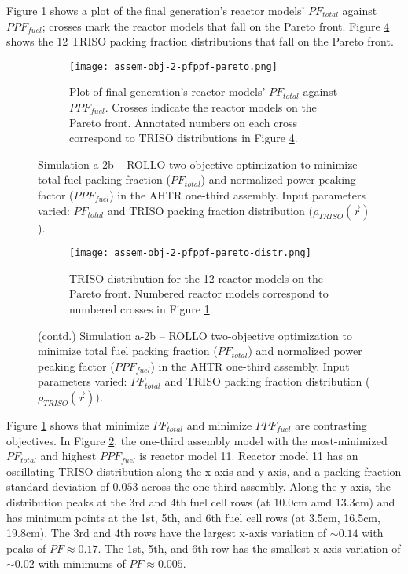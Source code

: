 Figure \ref{fig:assem-obj-2-pfppf-pareto} shows a plot of the final generation's reactor 
models' $PF_{total}$ against $PPF_{fuel}$; crosses mark the reactor models that fall on 
the Pareto front.
Figure \ref{fig:assem-obj-2-pfppf-pareto-distr} shows the 12 TRISO packing fraction 
distributions that fall on the Pareto front. 
\begin{figure}[htbp!]
    \begin{subfigure}{\textwidth}
        \centering
        \texttt{[image: assem-obj-2-pfppf-pareto.png]}
        \caption{Plot of final generation's reactor models' $PF_{total}$ against 
        $PPF_{fuel}$. 
        Crosses indicate the reactor models on the Pareto front. Annotated numbers 
        on each cross correspond to TRISO distributions in Figure 
        \ref{fig:assem-obj-2-pfppf-pareto-distr}.}
        \label{fig:assem-obj-2-pfppf-pareto} 
    \end{subfigure}
    \caption{Simulation a-2b -- ROLLO two-objective optimization to minimize total fuel 
    packing fraction ($PF_{total}$) and normalized power peaking factor ($PPF_{fuel}$) 
    in the \gls{AHTR} one-third assembly. 
    Input parameters varied: $PF_{total}$ and TRISO 
    packing fraction distribution ($\rho_{TRISO}(\vec{r})$).}
    \label{fig:assem-obj-2-pfppf}
\end{figure}
\begin{figure}[htbp!]
    \ContinuedFloat
    \begin{subfigure}{\textwidth}
        \centering
        \texttt{[image: assem-obj-2-pfppf-pareto-distr.png]}
        \caption{TRISO distribution for the 12 reactor models on the Pareto front.
        Numbered reactor models correspond to numbered crosses in Figure 
        \ref{fig:assem-obj-2-pfppf-pareto}. }
        \label{fig:assem-obj-2-pfppf-pareto-distr} 
    \end{subfigure}
    \caption{(contd.) Simulation a-2b -- ROLLO two-objective optimization to minimize total fuel 
    packing fraction ($PF_{total}$) and normalized power peaking factor ($PPF_{fuel}$) 
    in the \gls{AHTR} one-third assembly. 
    Input parameters varied: $PF_{total}$ and TRISO 
    packing fraction distribution ($\rho_{TRISO}(\vec{r})$).}
\end{figure}

Figure \ref{fig:assem-obj-2-pfppf-pareto} shows that minimize $PF_{total}$ and 
minimize $PPF_{fuel}$ are contrasting objectives. 
In Figure \ref{fig:assem-obj-2-pfppf}, the one-third assembly model with 
the most-minimized $PF_{total}$ and highest $PPF_{fuel}$ is reactor model 11. 
Reactor model 11 has an oscillating TRISO distribution along the 
x-axis and y-axis, and a packing fraction standard deviation of $0.053$ across the 
one-third assembly. 
Along the y-axis, the distribution peaks at the 3rd and 4th fuel cell rows (at 
10.0cm amd 13.3cm) and has minimum points at the 1st, 5th, and 6th fuel cell rows 
(at 3.5cm, 16.5cm, 19.8cm). 
The 3rd and 4th rows have the largest x-axis variation of ${\sim}0.14$ with 
peaks of $PF\approx0.17$. 
The 1st, 5th, and 6th row has the smallest x-axis variation of ${\sim}0.02$ with 
minimums of $PF\approx0.005$. 

